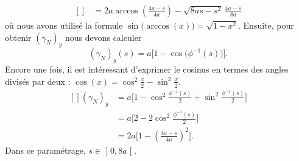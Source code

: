 \begin{example}
\begin{equation}
\begin{aligned}[]
						             & =2a\arccos\left( \frac{ 4a-s }{ 4a } \right)-\sqrt{8as-s^2}\,\frac{ 4a-s }{ 8a }
					\end{aligned}
				\end{equation}
				où nous avons utilisé la formule \( \sin\big( \arccos(x) \big)=\sqrt{1-x^2}\). Ensuite, pour obtenir \( (\gamma_N)_y\) nous devons calculer
				\begin{equation}
					(\gamma_N)_y(s)=a\big[ 1-\cos\big( \phi^{-1}(s) \big) \big].
				\end{equation}
				Encore une fois, il est intéressant d'exprimer le cosinus en termes des angles divisés par deux : \( \cos(x)=\cos^2\frac{ x }{2}-\sin^2\frac{ x }{2}\).
				\begin{equation}
					\begin{aligned}[]
						(\gamma_N)_y & =a\Big[ 1-\cos^2\frac{ \phi^{-1}(s) }{2}+\sin^2\frac{ \phi^{-1}(s) }{2} \Big] \\
						             & =a\Big[ 2-2\cos^2\frac{ \phi^{-1}(s) }{2} \Big]                               \\
						             & =2a\Big[ 1-\left( \frac{ 4a-s }{ 4a } \right)^2 \Big].
					\end{aligned}
				\end{equation}
				Dans ce paramétrage, \( s\in\mathopen] 0 , 8a \mathclose[\).
\end{example}

